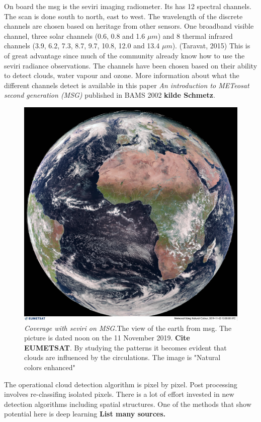 On board the \acrshort{msg} is the \acrfull{seviri} imaging radiometer. Its has  12 spectral channels. The scan is done south to north, east to west. The wavelength of the discrete channels are chosen based on heritage from other sensors. One broadband visible channel, three solar channels (0.6, 0.8 and 1.6 $\mu m$) and 8 thermal infrared channels (3.9, 6.2, 7.3, 8.7, 9.7, 10.8, 12.0 and 13.4 $\mu m$). (Taravat, 2015)  This is of great advantage since much of the community already know how to use the \acrshort{seviri} radiance observations. The channels have been chosen based on their ability to detect clouds, water vapour and ozone. More information about what the different channels detect is available in this paper \textit{An introduction to METeosat second generation (MSG)} published in BAMS 2002 \textbf{kilde Schmetz}. %
\begin{figure}[h]
    \centering
    \includegraphics[scale=0.11]{Chapter2_Theory/images/MET10_RGBNatColourEnhncd_FullResolution_20191123120000.jpg}    
    \caption{\textit{Coverage with \acrshort{seviri} on MSG.}The view of the earth from \acrshort{msg}. The picture is dated noon on the 11 November 2019. \textbf{Cite EUMETSAT}. By studying the patterns it becomes evident that clouds are influenced by the circulations. The image is "Natural colors enhanced"}
    \label{fig:sat_view}
\end{figure}
The operational cloud detection algorithm is pixel by pixel. Post processing involves re-classifing isolated pixels. There is a lot of effort invested in new detection algorithms including spatial structures. One of the methods that show potential here is deep learning \textbf{List many sources.}

